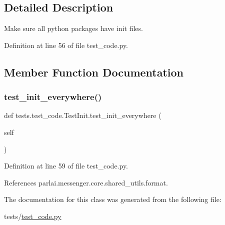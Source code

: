 \subsection{Detailed Description}
\begin{DoxyVerb}Make sure all python packages have init files.\end{DoxyVerb}
 

Definition at line 56 of file test\+\_\+code.\+py.



\subsection{Member Function Documentation}
\mbox{\label{classtests_1_1test__code_1_1TestInit_a8b97f4f48a8f21267c07578969c5612f}} 
\subsubsection{\texorpdfstring{test\+\_\+init\+\_\+everywhere()}{test\_init\_everywhere()}}
{\footnotesize\ttfamily def tests.\+test\+\_\+code.\+Test\+Init.\+test\+\_\+init\+\_\+everywhere (\begin{DoxyParamCaption}\item[{}]{self }\end{DoxyParamCaption})}



Definition at line 59 of file test\+\_\+code.\+py.



References parlai.\+messenger.\+core.\+shared\+\_\+utils.\+format.



The documentation for this class was generated from the following file\+:\begin{DoxyCompactItemize}
\item 
tests/\hyperlink{test__code_8py}{test\+\_\+code.\+py}\end{DoxyCompactItemize}
